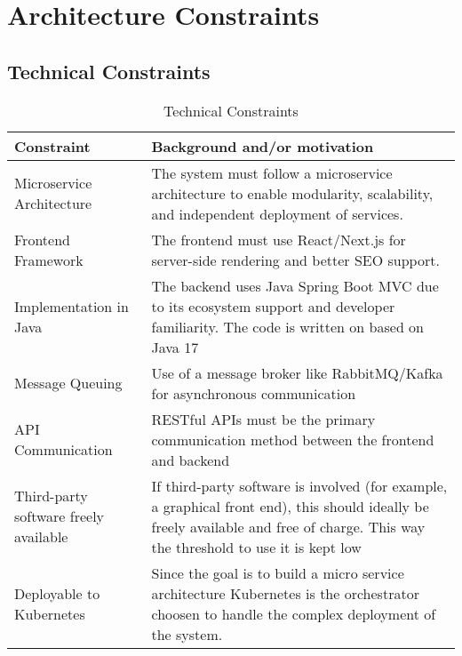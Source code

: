 \hypertarget{section-architecture-constraints}{%
\section{Architecture
Constraints}\label{section-architecture-constraints}}

\subsection{Technical Constraints}
\label{subsection:technical-constraints}

\begin{table}[htbp]
    \centering
    \begin{tabularx}{1\textwidth} {
        | >{\raggedright\arraybackslash}X
        | >{\raggedleft\arraybackslash}X | }
        \hline
        Constraint & Background and/or motivation \\
        \hline
        Microservice Architecture & The system must follow a microservice architecture to enable modularity, scalability, and independent deployment of services. \\
        \hline
        Frontend Framework & The frontend must use React/Next.js for server-side rendering and better SEO support. \\
        \hline
        Implementation in Java & The backend uses Java Spring Boot MVC due to its ecosystem support and developer familiarity. The code is written on based on Java 17 \\
        \hline
        Message Queuing & Use of a message broker like RabbitMQ/Kafka for asynchronous communication \\
        \hline
        API Communication & RESTful APIs must be the primary communication method between the frontend and backend \\
        \hline
        Third-party software freely available & If third-party software is involved (for example, a graphical front end), this should ideally be freely available and free of charge. This way the threshold to use it is kept low \\
        \hline
         Deployable to Kubernetes & Since the goal is to build a micro service architecture Kubernetes is the orchestrator choosen to handle the complex deployment of the system. \\
         \hline
    \end{tabularx}
    \caption{Technical Constraints}
    \label{tab:technical-constraints}
\end{table}

